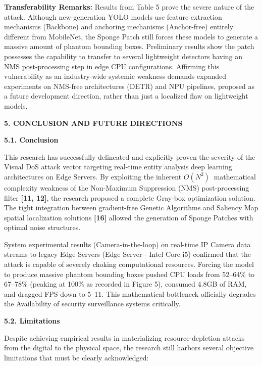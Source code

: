 \documentclass[]{article}
\begin{document}
\textbf{Transferability Remarks:} Results from Table 5 prove the severe nature of the attack. Although new-generation YOLO models use feature extraction mechanisms (Backbone) and anchoring mechanisms (Anchor-free) entirely different from MobileNet, the Sponge Patch still forces these models to generate a massive amount of phantom bounding boxes. Preliminary results show the patch possesses the capability to transfer to several lightweight detectors having an NMS post-processing step in edge CPU configurations. Affirming this vulnerability as an industry-wide systemic weakness demands expanded experiments on NMS-free architectures (DETR) and NPU pipelines, proposed as a future development direction, rather than just a localized flaw on lightweight models.

\textbf{5. CONCLUSION AND FUTURE DIRECTIONS}

\textbf{5.1. Conclusion}

This research has successfully delineated and explicitly proven the severity of the Visual DoS attack vector targeting real-time entity analysis deep learning architectures on Edge Servers. By exploiting the inherent \(O\left( N^{2} \right)\ \) mathematical complexity weakness of the Non-Maximum Suppression (NMS) post-processing filter \textbf{{[}11, 12{]}}, the research proposed a complete Gray-box optimization solution. The tight integration between gradient-free Genetic Algorithms and Saliency Map spatial localization solutions \textbf{{[}16{]}} allowed the generation of Sponge Patches with optimal noise structures.

System experimental results (Camera-in-the-loop) on real-time IP Camera data streams to legacy Edge Servers (Edge Server - Intel Core i5) confirmed that the attack is capable of severely choking computational resources. Forcing the model to produce massive phantom bounding boxes pushed CPU loads from 52--64\% to 67--78\% (peaking at 100\% as recorded in Figure 5), consumed 4.8GB of RAM, and dragged FPS down to 5--11. This mathematical bottleneck officially degrades the Availability of security surveillance systems critically.

\textbf{5.2. Limitations}

Despite achieving empirical results in materializing resource-depletion attacks from the digital to the physical space, the research still harbors several objective limitations that must be clearly acknowledged:
\end{document}
